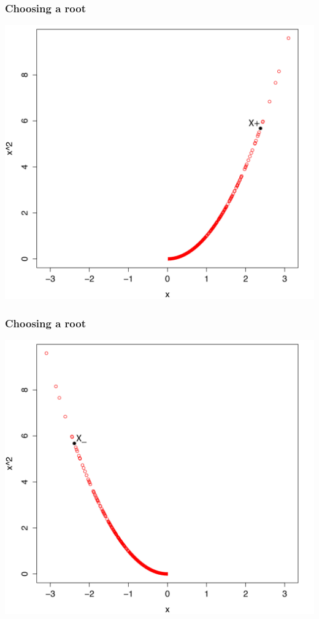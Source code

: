 \documentclass{beamer}
\begin{document}
\begin{frame}
  \frametitle{Choosing a root}
  \vspace{-.05 in} %
  \centering
\includegraphics[scale=.45]{ChooseXplus.pdf}
 \end{frame}
 
 
\begin{frame}
  \frametitle{Choosing a root}
  \vspace{-.05 in} %
  \centering
\includegraphics[scale=.45]{ChooseXmin.pdf}
 \end{frame}
\end{document}
